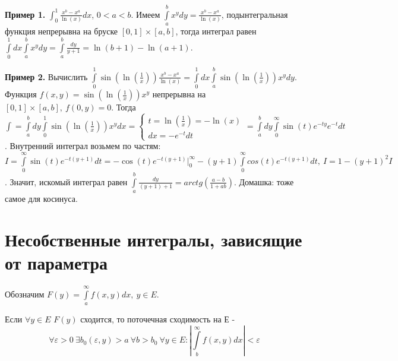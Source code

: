 \textbf{Пример 1.} $\int_{0}^{1} \frac{x^b-x^a}{\ln(x)}dx$, $0<a<b$.  
Имеем $\int\limits_{a}^{b} x^ydy=\frac{x^b-x^a}{\ln(x)}$, 
подынтегральная функция непрерывна на бруске $[0,1]\times[a,b]$, 
тогда интеграл равен $\int\limits_{0}^{1}dx\int\limits_{a}^{b}x^ydy=
\int\limits_{a}^{b}\frac{dy}{y+1}=\ln(b+1)-\ln(a+1)$.

\textbf{Пример 2.} Вычислить $\int\limits_{0}^{1}\sin(\ln(\frac{1}{x}))
\frac{x^b-x^a}{\ln(x)}=\int\limits_{0}^{1}dx \int\limits_{a}^{b}
\sin(\ln(\frac{1}{x}))x^ydy$. Функция $f(x,y)=\sin(\ln(\frac{1}{x}))x^y$ 
непрерывна на $[0,1]\times[a,b],~f(0,y)=0$. Тогда
$\int=\int\limits_{a}^{b}dy \int\limits_{0}^{1}\sin(\ln(\frac{1}{x}))x^ydx=
\begin{cases} t=\ln(\frac{1}{x})=-\ln(x)\\dx=-e^{-t}dt\end{cases}= 
\int\limits_{a}^{b} dy \int\limits_{0}^{\infty} \sin(t)e^{-ty}e^{-t}dt$. 
Внутренний интеграл возьмем по частям: $I=\int\limits_{0}^{\infty}
\sin(t)e^{-t(y+1)}dt=-\cos(t)e^{-t(y+1)}\big|_0^\infty
-(y+1)\int\limits_{0}^{\infty}cos(t)e^{-t(y+1)}dt,~I=1-(y+1)^2I$.
Значит, искомый интеграл равен 
$\int\limits_{a}^{b}\frac{dy}{(y+1)+1}=arctg\left( \frac{a-b}{1+ab}\right)$.
Домашка: тоже самое для косинуса.
\section{Несобственные интегралы, зависящие от параметра}
Обозначим $F(y)=\int\limits_{a}^{\infty}f(x,y)dx,~y\in E$. 
\begin{defin}
Если $\forall y\in E$ $F(y)$ сходится, то поточечная сходимость на Е - 
$$\forall \varepsilon>0~\exists b_0(\varepsilon,y)>a~
\forall b>b_0~\forall y\in E:\left| \int\limits_{b}^{\infty}f(x,y)dx\right|
<\varepsilon$$
\end{defin}

